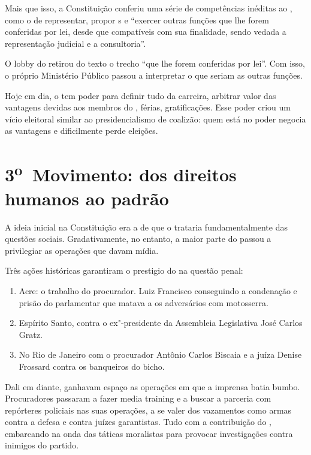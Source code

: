 Mais que isso, a Constituição conferiu uma série de competências
inéditas ao , como o de representar, propor s e ``exercer outras
funções que lhe forem conferidas por lei, desde que compatíveis com sua
finalidade, sendo vedada a representação judicial e a consultoria''.

O lobby do  retirou do texto o trecho ``que lhe forem conferidas por
lei''. Com isso, o próprio Ministério Público passou a interpretar o que
seriam as outras funções.

Hoje em dia, o  tem poder para definir tudo da carreira, arbitrar
valor das vantagens devidas aos membros do , férias, gratificações.
Esse poder criou um vício eleitoral similar ao presidencialismo de
coalizão: quem está no poder negocia as vantagens e dificilmente perde
eleições.

\section{3\textsuperscript{o}~Movimento: dos direitos humanos ao padrão
}

A ideia inicial na Constituição era a de que o  trataria
fundamentalmente das questões sociais. Gradativamente, no entanto, a
maior parte do  passou a privilegiar as operações que davam mídia.

Três ações históricas garantiram o prestigio do  na questão penal:

\begin{enumerate}
\itemsep1pt\parskip0pt
\item
  Acre: o trabalho do procurador. Luiz Francisco conseguindo a
  condenação e prisão do parlamentar que matava a os adversários com
  motosserra.
\item
  Espírito Santo, contra o ex"-presidente da Assembleia Legislativa José
  Carlos Gratz.
\item
  No Rio de Janeiro com o procurador Antônio Carlos Biscaia e a juíza
  Denise Frossard contra os banqueiros do bicho.
\end{enumerate}

Dali em diante, ganhavam espaço as operações em que a imprensa batia
bumbo. Procuradores passaram a fazer media training e a buscar a
parceria com repórteres policiais nas suas operações, a se valer dos
vazamentos como armas contra a defesa e contra juízes garantistas. Tudo
com a contribuição do , embarcando na onda das táticas moralistas para
provocar investigações contra inimigos do partido.

